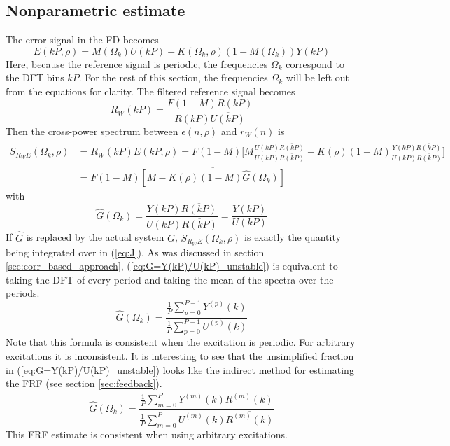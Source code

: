 \subsection{Nonparametric estimate}
The error signal in the FD becomes
\begin{equation*}
    E(kP,\rho) = M(\Omega_k) U(kP) - K(\Omega_k,\rho) (1-M(\Omega_k)) Y(kP)
\end{equation*}
Here, because the reference signal is periodic, the frequencies $\Omega_k$ correspond to the DFT bins $kP$. For the rest of this section, the frequencies $\Omega_k$ will be left out from the equations for clarity.
The filtered reference signal becomes
\begin{equation*}
    R_W(kP) = \frac{F (1-M) R(kP)}{R(kP) \overline{U(kP)}}
\end{equation*}
Then the cross-power spectrum between $\epsilon(n,\rho)$ and $r_W(n)$ is
\begin{align*}
    S_{R_W\!E}(\Omega_k,\rho) &= R_W(kP) \overline{E(kP,\rho)} = F(1-M) \overline{\Big[M \frac{U(kP) \overline{R(kP)}}{U(kP) \overline{R(kP)}} - K(\rho) (1-M) \frac{Y(kP) \overline{R(kP)}}{U(kP) \overline{R(kP)}}\Big]}\\
    &= F(1-M) \overline{[M - K(\rho) (1-M) \hat{G}(\Omega_k) ]}
\end{align*}
with 
\begin{equation}
    \hat{G}(\Omega_k) = \frac{Y(kP) \overline{R(kP)}}{U(kP) \overline{R(kP)}} = \frac{Y(kP)}{U(kP)}
    \label{eq:G=Y(kP)/U(kP)_unstable}
\end{equation}
If $\hat G$ is replaced by the actual system $G$, $S_{R_W\!E}(\Omega_k,\rho)$ is exactly the quantity being integrated over in (\ref{eq:J}). As was discussed in section \ref{sec:corr_based_approach}, (\ref{eq:G=Y(kP)/U(kP)_unstable}) is equivalent to taking the DFT of every period and taking the mean of the spectra over the periods.
\begin{equation*}
    \hat G(\Omega_k) = \frac{\frac{1}{P}\sum_{p=0}^{P-1}  Y^{(p)}(k)}{\frac{1}{P}\sum_{p=0}^{P-1}  U^{(p)}(k)}
\end{equation*}
Note that this formula is consistent when the excitation is periodic. For arbitrary excitations it is inconsistent. It is interesting to see that the unsimplified fraction in (\ref{eq:G=Y(kP)/U(kP)_unstable}) looks like the indirect method for estimating the FRF (see section \ref{sec:feedback}).
\begin{equation*}
    \hat G(\Omega_k) = \frac{ \frac{1}{P}\sum_{m=0}^P Y^{(m)}(k) \overline{R^{(m)}(k)} } { \frac{1}{P}\sum_{m=0}^P U^{(m)}(k) \overline{R^{(m)}(k)} }
\end{equation*}
This FRF estimate is consistent when using arbitrary excitations.


